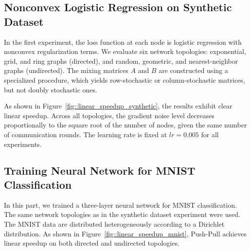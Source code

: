 \documentclass[10pt]{article}
\newcommand{\pushpull}{{\sc Push-Pull}\xspace}
\begin{document}
\subsection{Nonconvex Logistic Regression on Synthetic Dataset}\label{subsec::synthetic}

In the first experiment, the loss function at each node is logistic regression with nonconvex regularization terms.  
We evaluate six network topologies: exponential, grid, and ring graphs (directed), and random, geometric, and nearest-neighbor graphs (undirected).  
The mixing matrices $A$ and $B$ are constructed using a specialized procedure, which yields row-stochastic or column-stochastic matrices, but not doubly stochastic ones. 

As shown in Figure~\ref{fig::linear_speedup_synthetic}, the results exhibit clear linear speedup.  
Across all topologies, the gradient noise level decreases proportionally to the square root of the number of nodes, given the same number of communication rounds.  
The learning rate is fixed at $lr = 0.005$ for all experiments.





\subsection{Training Neural Network for MNIST Classification}

In this part, we trained a three-layer neural network for MNIST classification.  
The same network topologies as in the synthetic dataset experiment were used.  
The MNIST data are distributed heterogeneously according to a Dirichlet distribution. 
As shown in Figure~\ref{fig::linear_speedup_mnist}, \pushpull achieves linear speedup on both directed and undirected topologies.
\end{document}
